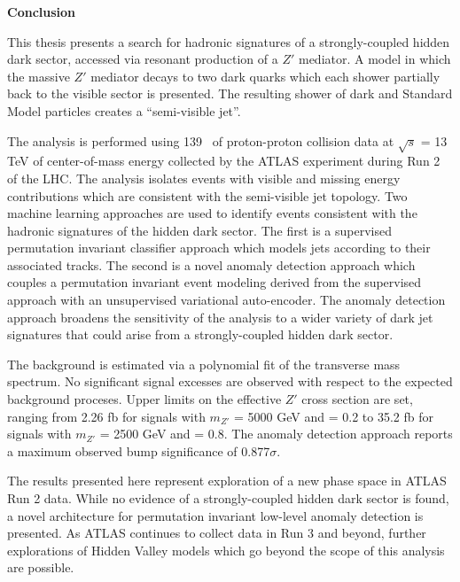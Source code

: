 
\begin{center}
\pagebreak
\vspace*{1\baselineskip}
\textbf{\large Conclusion}
\end{center}


This thesis presents a search for hadronic signatures of a strongly-coupled hidden dark sector, accessed via resonant production of a $Z'$ mediator. A model in which the massive $Z'$ mediator decays to two dark quarks which each shower partially back to the visible sector is presented. The resulting shower of dark and Standard Model particles creates a ``semi-visible jet''.\par

The analysis is performed using 139 \fb~of proton-proton collision data at $\sqrt{s}$ = 13 TeV of center-of-mass energy collected by the ATLAS experiment during Run 2 of the LHC. The analysis isolates events with visible and missing energy contributions which are consistent with the semi-visible jet topology. Two machine learning approaches are used to identify events consistent with the hadronic signatures of the hidden dark sector. The first is a supervised permutation invariant classifier approach which models jets according to their associated tracks. The second is a novel anomaly detection approach which couples a permutation invariant event modeling derived from the supervised approach with an unsupervised variational auto-encoder. The anomaly detection approach broadens the sensitivity of the analysis to a wider variety of dark jet signatures that could arise from a strongly-coupled hidden dark sector.\par

The background is estimated via a polynomial fit of the transverse mass spectrum. No significant signal excesses are observed with respect to the expected background proceses. Upper limits on the effective $Z'$ cross section are set, ranging from 2.26 fb for signals with $m_{Z'}$ = 5000 GeV and \rinv = 0.2 to 35.2 fb for signals with $m_{Z'}$ = 2500 GeV and \rinv = 0.8. The anomaly detection approach reports a maximum observed bump significance of 0.877$\sigma$. \par

The results presented here represent exploration of a new phase space in ATLAS Run 2 data. While no evidence of a strongly-coupled hidden dark sector is found, a novel architecture for permutation invariant low-level anomaly detection is presented. As ATLAS continues to collect data in Run 3 and beyond, further explorations of Hidden Valley models which go beyond the scope of this analysis are possible.




